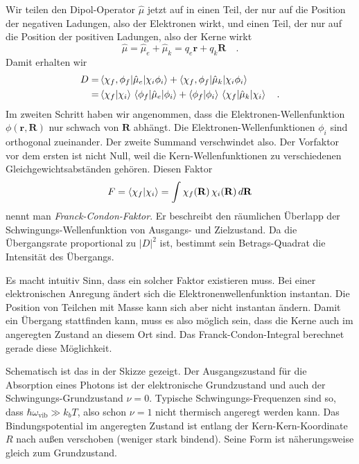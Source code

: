 Wir teilen den Dipol-Operator $\hat{\mu}$ jetzt auf in einen Teil, der nur auf die Position der negativen Ladungen, also der Elektronen wirkt, und einen Teil, der nur auf die Position der positiven Ladungen, also der Kerne wirkt
\begin{equation}
\hat{\mu} = \hat{\mu}_e + \hat{\mu}_k = q_e \mathbf{r} + q_k \mathbf{R} \quad .
\end{equation}
Damit erhalten wir
\begin{align}
D = & \braket{ \chi_f, \phi_f  |  \hat{\mu}_e |  \chi_i \phi_i} 
+ \braket{ \chi_f, \phi_f  |  \hat{\mu}_k |  \chi_i \phi_i}  \\
= & \braket{\chi_f | \chi_i} \,  \braket{ \phi_f  |  \hat{\mu}_e |   \phi_i} 
+ \braket{\phi_f | \phi_i} \,
\braket{ \chi_f |  \hat{\mu}_k |  \chi_i }   \quad .
\end{align} 
Im zweiten Schritt haben wir angenommen,  dass die Elektronen-Wellenfunktion $ \phi(\mathbf{r}, \mathbf{R})$  nur schwach von $\mathbf{R}$ abhängt. Die  Elektronen-Wellenfunktionen $\phi_i$ sind orthogonal zueinander. Der zweite Summand verschwindet also. Der Vorfaktor vor dem ersten ist nicht Null, weil die Kern-Wellenfunktionen zu verschiedenen Gleichgewichtsabständen gehören. Diesen Faktor 
\begin{equation}
 F =  \braket{\chi_f | \chi_i} =
 \int  \chi_f(\mathbf{R})  \,  \chi_i(\mathbf{R}) \, d \mathbf{R} 
\end{equation}
nennt man \emph{Franck-Condon-Faktor}. Er beschreibt den räumlichen Überlapp der Schwingungs-Wellenfunktion von Ausgangs- und Zielzustand. Da die Übergangsrate proportional zu $|D|^2$ ist, bestimmt sein Betrags-Quadrat die Intensität des Übergangs. 



Es macht intuitiv Sinn, dass ein solcher Faktor existieren muss. Bei einer elektronischen Anregung ändert sich die Elektronenwellenfunktion instantan. Die Position von  Teilchen mit Masse kann sich aber nicht instantan ändern.  Damit ein Übergang stattfinden kann, muss es also möglich sein, dass die Kerne auch im angeregten Zustand an diesem Ort sind. Das Franck-Condon-Integral berechnet gerade diese Möglichkeit.

Schematisch ist das in der Skizze gezeigt. Der Ausgangszustand für die Absorption eines Photons ist der elektronische Grundzustand und auch der Schwingungs-Grundzustand $\nu = 0$. Typische Schwingungs-Frequenzen sind so, dass $\hbar \omega_\text{vib} \gg k_b T$, also schon $\nu =1$ nicht thermisch angeregt werden kann. Das Bindungspotential im angeregten Zustand ist entlang der Kern-Kern-Koordinate $R$ nach außen verschoben (weniger stark bindend). Seine Form ist näherungsweise gleich zum Grundzustand. 

